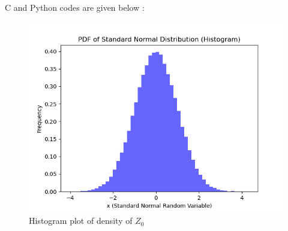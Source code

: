\documentclass[article]{IEEEtran}
\theoremstyle{remark}
\begin{document}
C and Python codes are given below :
  
  
\begin{figure}[!ht]
  \centering
  \includegraphics[width=\columnwidth]{2023/ST/15/figs/figure1.png}  %
  \caption{Histogram plot of density of $Z_0$}
  \label{fig:your_label}
\end{figure}
\end{document}
